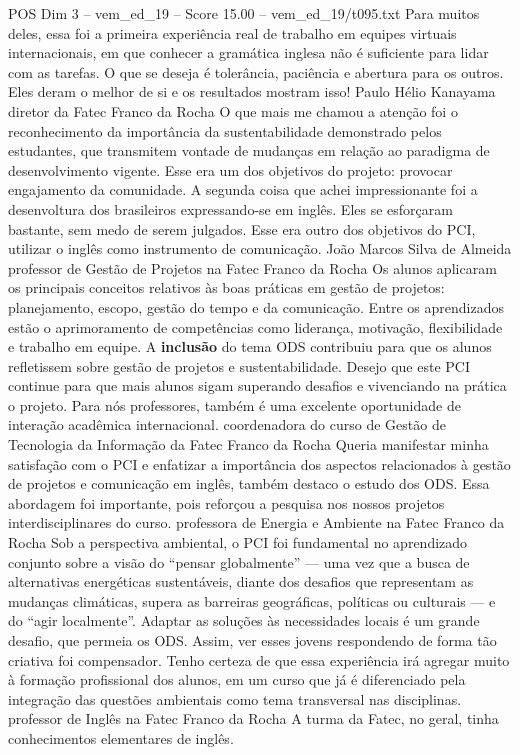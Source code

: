 \begin{textsample}{POS Dim 3 – vem\_ed\_19 – Score 15.00 – vem\_ed\_19/t095.txt}
Para muitos deles, essa foi a primeira experiência real de trabalho em equipes virtuais internacionais, em que conhecer a gramática inglesa não é suficiente para lidar com as tarefas.
O que se deseja é tolerância, paciência e abertura para os outros.
Eles deram o melhor de si e os resultados mostram isso!
Paulo Hélio Kanayama diretor da Fatec Franco da Rocha O que mais me chamou a atenção foi o reconhecimento da importância da sustentabilidade demonstrado pelos estudantes, que transmitem vontade de mudanças em relação ao paradigma de desenvolvimento vigente.
Esse era um dos objetivos do projeto: provocar engajamento da comunidade.
A segunda coisa que achei impressionante foi a desenvoltura dos brasileiros expressando-se em inglês.
Eles se esforçaram bastante, sem medo de serem julgados.
Esse era outro dos objetivos do PCI, utilizar o inglês como instrumento de comunicação.
João Marcos Silva de Almeida professor de Gestão de Projetos na Fatec Franco da Rocha Os alunos aplicaram os principais conceitos relativos às boas práticas em gestão de projetos: planejamento, escopo, gestão do tempo e da comunicação.
Entre os aprendizados estão o aprimoramento de competências como liderança, motivação, flexibilidade e trabalho em equipe.
A \textbf{inclusão} do tema ODS contribuiu para que os alunos refletissem sobre gestão de projetos e sustentabilidade.
Desejo que este PCI continue para que mais alunos sigam superando desafios e vivenciando na prática o projeto.
Para nós professores, também é uma excelente oportunidade de interação acadêmica internacional. coordenadora do curso de Gestão de Tecnologia da Informação da Fatec Franco da Rocha Queria manifestar minha satisfação com o PCI e enfatizar a importância dos aspectos relacionados à gestão de projetos e comunicação em inglês, também destaco o estudo dos ODS.
Essa abordagem foi importante, pois reforçou a pesquisa nos nossos projetos interdisciplinares do curso. professora de Energia e Ambiente na Fatec Franco da Rocha Sob a perspectiva ambiental, o PCI foi fundamental no aprendizado conjunto sobre a visão do “pensar globalmente” — uma vez que a busca de alternativas energéticas sustentáveis, diante dos desafios que representam as mudanças climáticas, supera as barreiras geográficas, políticas ou culturais — e do “agir localmente”.
Adaptar as soluções às necessidades locais é um grande desafio, que permeia os ODS.
Assim, ver esses jovens respondendo de forma tão criativa foi compensador.
Tenho certeza de que essa experiência irá agregar muito à formação profissional dos alunos, em um curso que já é diferenciado pela integração das questões ambientais como tema transversal nas disciplinas. professor de Inglês na Fatec Franco da Rocha A turma da Fatec, no geral, tinha conhecimentos elementares de inglês.

\end{textsample}
